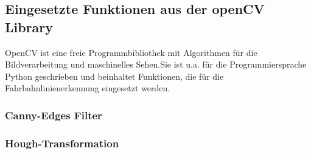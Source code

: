 \subsection{Eingesetzte Funktionen aus der openCV Library}
\glqq OpenCV ist eine freie Programmbibliothek mit Algorithmen für die 
Bildverarbeitung und maschinelles Sehen.\grqq Sie ist u.a. für die
Programmiersprache Python geschrieben und beinhaltet Funktionen, die für die
Fahrbahnlinienerkennung eingesetzt werden.\\
\subsubsection{Canny-Edges Filter}

\subsubsection{Hough-Transformation}
